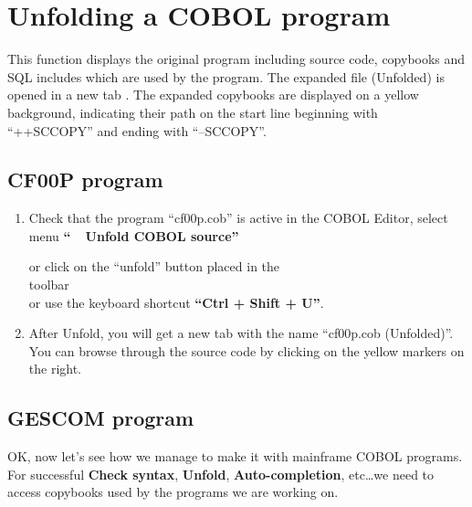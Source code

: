 \chapter{Unfolding a COBOL program}
This function displays the original program including source code, copybooks and SQL includes which are used by the program. The expanded file (Unfolded) is opened in a new tab . The expanded copybooks are displayed on a yellow background, indicating their path on the start line beginning with ``++SCCOPY'' and ending with ``--SCCOPY''.

\section{CF00P program}

\begin{enumerate}
\item Check that the program ``cf00p.cob'' is active in the COBOL Editor, select menu \textbf{``\mxproduct~\RHD~Unfold COBOL source''}
\\ \parbox{8cm}{or click on the ``unfold'' button placed in the\\toolbar {}\\or use the keyboard shortcut \textbf{``Ctrl + Shift + U''}.}

\item After Unfold, you will get a new tab with the name ``cf00p.cob (Unfolded)''.
You can browse through the source code by clicking on the yellow markers on the right.
\\[1.5ex]

\end{enumerate}


\section{GESCOM program}

OK, now let's see how we manage to make it with mainframe COBOL programs. For successful \textbf{Check syntax}, \textbf{Unfold}, \textbf{Auto-completion}, etc\dots  we need to access copybooks used by the programs we are working on.

